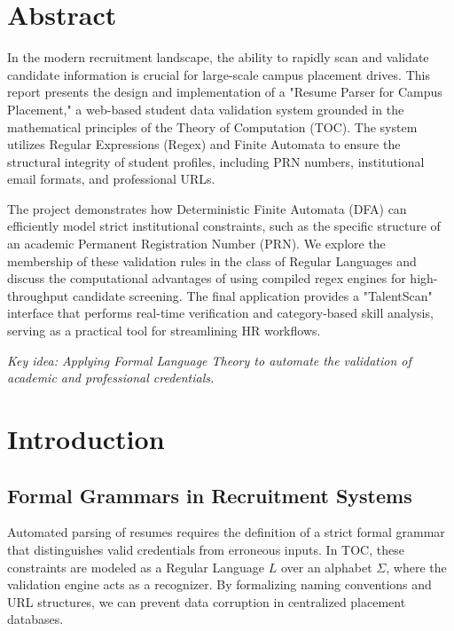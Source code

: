 \documentclass[12pt,a4paper]{article}
\begin{document}
\newpage
\onehalfspacing

\section{Abstract}
In the modern recruitment landscape, the ability to rapidly scan and validate candidate information is crucial for large-scale campus placement drives. This report presents the design and implementation of a "Resume Parser for Campus Placement," a web-based student data validation system grounded in the mathematical principles of the Theory of Computation (TOC). The system utilizes Regular Expressions (Regex) and Finite Automata to ensure the structural integrity of student profiles, including PRN numbers, institutional email formats, and professional URLs.

The project demonstrates how Deterministic Finite Automata (DFA) can efficiently model strict institutional constraints, such as the specific structure of an academic Permanent Registration Number (PRN). We explore the membership of these validation rules in the class of Regular Languages and discuss the computational advantages of using compiled regex engines for high-throughput candidate screening. The final application provides a "TalentScan" interface that performs real-time verification and category-based skill analysis, serving as a practical tool for streamlining HR workflows.

\vfill
\textit{Key idea: Applying Formal Language Theory to automate the validation of academic and professional credentials.}

\newpage

\section{Introduction}

\subsection{Formal Grammars in Recruitment Systems}
Automated parsing of resumes requires the definition of a strict formal grammar that distinguishes valid credentials from erroneous inputs. In TOC, these constraints are modeled as a Regular Language $L$ over an alphabet $\Sigma$, where the validation engine acts as a recognizer. By formalizing naming conventions and URL structures, we can prevent data corruption in centralized placement databases.
\end{document}
